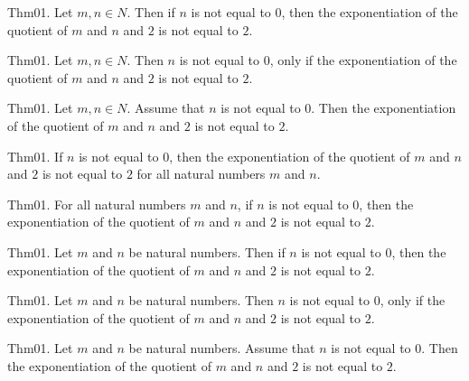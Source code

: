 \documentclass{article}
\begin{document}
Thm01. Let $m , n \in N$. Then if $n$ is not equal to $0$, then the exponentiation of the quotient of $m$ and $n$ and $2$ is not equal to $2$.

Thm01. Let $m , n \in N$. Then $n$ is not equal to $0$, only if the exponentiation of the quotient of $m$ and $n$ and $2$ is not equal to $2$.

Thm01. Let $m , n \in N$. Assume that $n$ is not equal to $0$. Then the exponentiation of the quotient of $m$ and $n$ and $2$ is not equal to $2$.

Thm01. If $n$ is not equal to $0$, then the exponentiation of the quotient of $m$ and $n$ and $2$ is not equal to $2$ for all natural numbers $m$ and $n$.

Thm01. For all natural numbers $m$ and $n$, if $n$ is not equal to $0$, then the exponentiation of the quotient of $m$ and $n$ and $2$ is not equal to $2$.

Thm01. Let $m$ and $n$ be natural numbers. Then if $n$ is not equal to $0$, then the exponentiation of the quotient of $m$ and $n$ and $2$ is not equal to $2$.

Thm01. Let $m$ and $n$ be natural numbers. Then $n$ is not equal to $0$, only if the exponentiation of the quotient of $m$ and $n$ and $2$ is not equal to $2$.

Thm01. Let $m$ and $n$ be natural numbers. Assume that $n$ is not equal to $0$. Then the exponentiation of the quotient of $m$ and $n$ and $2$ is not equal to $2$.
\end{document}
